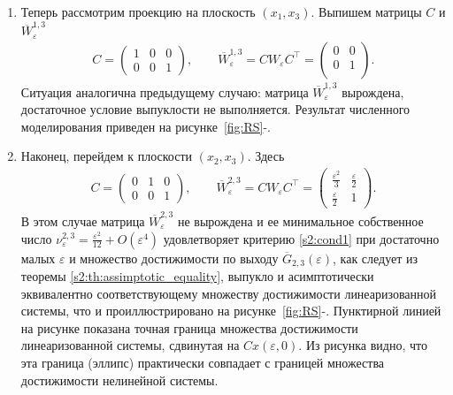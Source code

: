 \documentclass[../main.tex]{subfiles}
\begin{document}
\begin{enumerate}
 
 \item Теперь рассмотрим проекцию на плоскость $ (x_1, x_3) $. 
Выпишем матрицы $ C $ и $ \overline{W}_{\varepsilon}^{1,3} $
 \begin{gather*}
 C = \begin{pmatrix}
 1 & 0 & 0 \\
 0 & 0 & 1
 \end{pmatrix}, \qquad
 \overline{W}_{\varepsilon}^{1,3} = C W_{\varepsilon} C^{\top} =\begin{pmatrix}
 0 & 0 \\
 0 & 1 \\
 \end{pmatrix} .
 \end{gather*}
 Ситуация аналогична предыдущему случаю: матрица $ \overline{W}_{\varepsilon}^{1,3} $ вырождена, достаточное условие выпуклости не выполняется. 
Результат численного моделирования приведен на рисунке~\ref{fig:RS}-.
 \item Наконец, перейдем к плоскости $ (x_2, x_3) $. 
Здесь
 \begin{gather*}
 C = \begin{pmatrix}
 0 & 1 & 0 \\
 0 & 0 & 1
 \end{pmatrix}, \qquad \overline{W}_{\varepsilon}^{2,3} = C W_{\varepsilon} C^{\top} =\begin{pmatrix}
 \frac{\varepsilon^2}{3} & \frac{\varepsilon}{2} \\
 \frac{\varepsilon}{2} & 1
 \end{pmatrix}.
 \end{gather*}
 В этом случае матрица $ \overline{W}_{\varepsilon}^{2,3} $ не вырождена и ее минимальное собственное число $ \nu^{2,3}_{\varepsilon} = \frac{\varepsilon^2}{12} + O(\varepsilon^4) $ удовлетворяет критерию \eqref{s2:cond1} при достаточно малых $ \varepsilon $ и множество достижимости по выходу $ \overline{G}_{2,3}(\varepsilon) $, как следует из теоремы \ref{s2:th:assimptotic_equality}, выпукло и асимптотически эквивалентно соответствующему множеству достижимости линеаризованной системы, что и проиллюстрировано на рисунке~\ref{fig:RS}-. 
Пунктирной линией на рисунке показана точная граница множества достижимости линеаризованной системы, сдвинутая на $ Cx(\varepsilon, 0) $. Из рисунка видно, что эта граница (эллипс) практически совпадает с границей множества достижимости нелинейной системы.
 \end{enumerate} 
 
\end{document}

